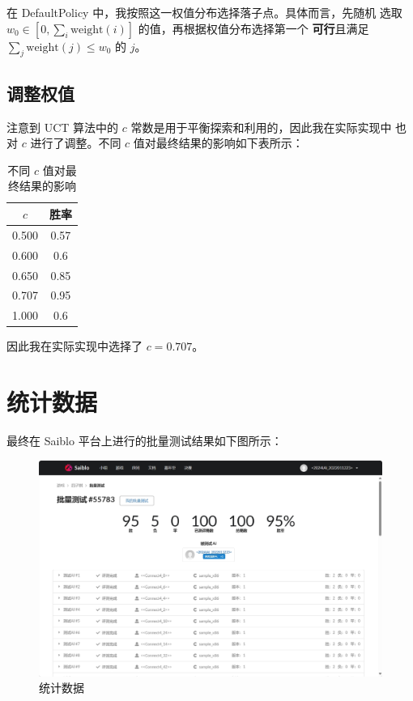 \documentclass[UTF8]{ctexart}
\begin{document}
在 DefaultPolicy 中，我按照这一权值分布选择落子点。具体而言，先随机
选取 $w_0 \in [0, \sum_i\text{weight}(i)]$ 的值，再根据权值分布选择第一个
\textbf{可行}且满足 $\sum_j\text{weight}(j) \le w_0$ 的 $j$。

\subsection{调整权值}

注意到 UCT 算法中的 $c$ 常数是用于平衡探索和利用的，因此我在实际实现中
也对 $c$ 进行了调整。不同 $c$ 值对最终结果的影响如下表所示：
\begin{table}[H]
    \centering
    \begin{tabular}{||c|c||}
        \hline
        $c$ & 胜率 \\
        \hline
        0.500 & 0.57 \\
        0.600 & 0.6 \\
        0.650 & 0.85 \\
        0.707 & 0.95 \\
        1.000 & 0.6 \\
        \hline
    \end{tabular}
    \caption{不同 $c$ 值对最终结果的影响}
\end{table}
因此我在实际实现中选择了 $c = 0.707$。

\section{统计数据}

最终在 Saiblo 平台上进行的批量测试结果如下图所示：

\begin{figure}[H]
    \centering
    \includegraphics[width=\textwidth]{../assets/result.png}
    \caption{统计数据}
\end{figure}
\end{document}
